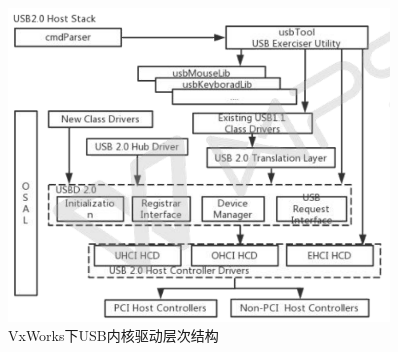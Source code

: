 \begin{figure}[!h]
\centering
\includegraphics[width=0.9\textwidth]{./graphics/VxWorks_USB_kernel_diagram.pdf}
\caption{VxWorks下USB内核驱动层次结构}\label{fig:VxWorks_USB_kernel_diagram}
\end{figure}

